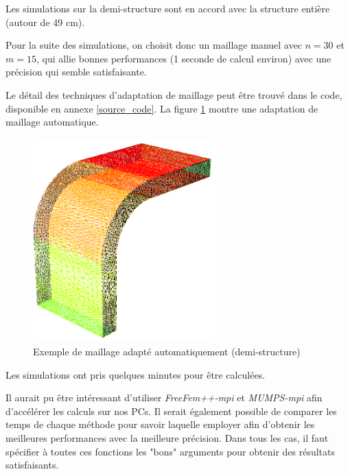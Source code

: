     Les simulations sur la demi-structure sont en accord avec la structure entière (autour de 49 cm).

    Pour la suite des simulations, on choisit donc un maillage manuel avec $n=30$ et $m=15$, qui allie bonnes performances (1 seconde de calcul environ) avec une précision qui semble satisfaisante.
    
    Le détail des techniques d'adaptation de maillage peut être trouvé dans le code, disponible en annexe \ref{source_code}.
    La figure \ref{fig:maillage_auto} montre une adaptation de maillage automatique.
    
    \begin{figure}        
        \begin{center}
        
            \includegraphics[width=7cm]{imgs/half_maillage_auto.PNG}
            \caption{Exemple de maillage adapté automatiquement (demi-structure)}
            \label{fig:maillage_auto}
        
        \end{center}
    \end{figure}

    Les simulations ont pris quelques minutes pour être calculées. 

    Il aurait pu être intéressant d'utiliser \emph{FreeFem++-mpi} et \emph{MUMPS-mpi} afin d'accélérer les calculs sur nos PCs.
    Il serait également possible de comparer les temps de chaque méthode pour savoir laquelle employer afin d'obtenir les meilleures performances avec la meilleure précision.
    Dans tous les cas, il faut spécifier à toutes ces fonctions les "bons" arguments pour obtenir des résultats satisfaisants.




